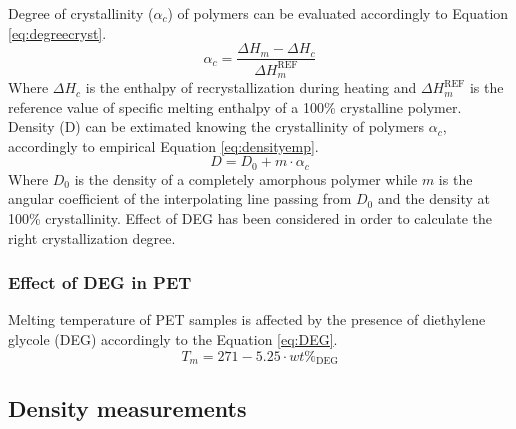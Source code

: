 \documentclass[a4paper, 11pt]{article}
\begin{document}
Degree of crystallinity ($\alpha_c$) of polymers can be evaluated accordingly to Equation \ref{eq:degreecryst}.
\begin{equation}
\alpha_c = \frac{\Delta H_m - \Delta H_c}{\Delta H_m^{\text{REF}}}
\label{eq:degreecryst}
\end{equation}
Where $\Delta H_c$ is the enthalpy of recrystallization during heating and $\Delta H_m^{\text{REF}}$ is the reference value of specific melting enthalpy of a 100\% crystalline polymer.\\
Density (D) can be extimated knowing the crystallinity of polymers $\alpha_c$, accordingly to empirical Equation \ref{eq:densityemp}.
\begin{equation}
D = D_0+m\cdot \alpha_c
\label{eq:densityemp}
\end{equation}
Where $D_0$ is the density of a completely amorphous polymer while $m$ is the angular coefficient of the interpolating line passing from $D_0$ and the density at 100\% crystallinity. Effect of DEG has been considered in order to calculate the right crystallization degree.

\subsubsection{Effect of DEG in PET}

Melting temperature of PET samples is affected by the presence of diethylene glycole (DEG) accordingly to the Equation \ref{eq:DEG}.
\begin{equation}
T_m = 271-5.25\cdot wt\%_\text{DEG}
\label{eq:DEG}
\end{equation}

\subsection{Density measurements}
\end{document}
